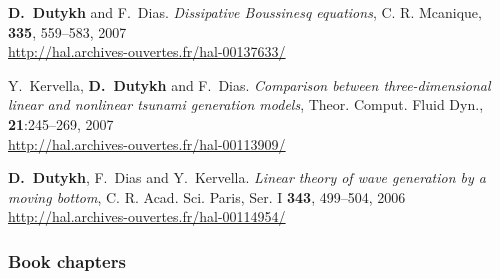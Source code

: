 \begin{etaremune}
  \item \textbf{D.~Dutykh} and F.~Dias. \textit{Dissipative Boussinesq equations}, C. R. Mcanique, \textbf{335}, 559--583, 2007 \\ %
  \url{http://hal.archives-ouvertes.fr/hal-00137633/}
  
  \item  Y.~Kervella, \textbf{D.~Dutykh} and F.~Dias. \textit{Comparison between three-dimensional linear and nonlinear tsunami generation models}, Theor. Comput. Fluid Dyn., \textbf{21}:245--269, 2007 \\ %
  \url{http://hal.archives-ouvertes.fr/hal-00113909/}
  
  
  
  \item \textbf{D.~Dutykh}, F.~Dias and Y.~Kervella. \textit{Linear theory of wave generation by a moving bottom}, C. R. Acad. Sci. Paris, Ser. I \textbf{343}, 499--504, 2006 \\ %
  \url{http://hal.archives-ouvertes.fr/hal-00114954/}
 
\end{etaremune}

\separator
\subsubsection{Book chapters}

